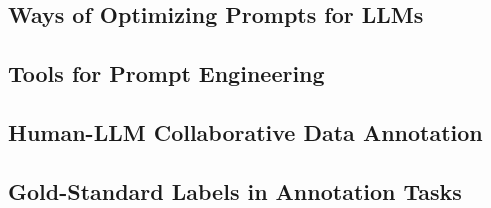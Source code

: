 

\subsection{Ways of Optimizing Prompts for LLMs}


\subsection{Tools for Prompt Engineering}


\subsection{Human-LLM Collaborative Data Annotation}


%

\subsection{Gold-Standard Labels in Annotation Tasks}\label{sec:related-work-gold-label}




%

